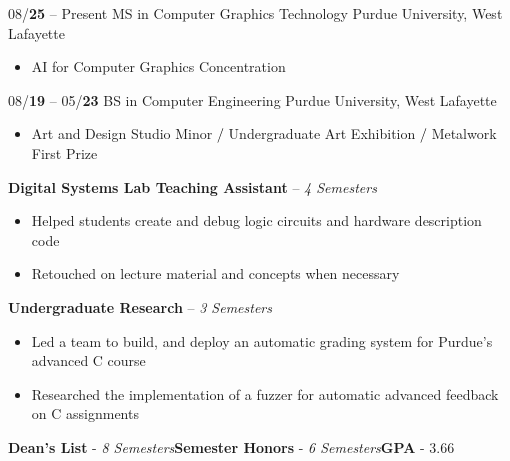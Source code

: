 \documentclass[9pt]{developercv} %
\begin{document}

\vspace{-\headheight}



\begin{entrylist}
	\vspace{-.5\headheight}
	\entry
		{08/\textbf{25} -- Present}
		{MS in Computer Graphics Technology}
		{Purdue University, West Lafayette}
		{
			\vspace{-\baselineskip}
			\begin{itemize}[noitemsep,topsep=0pt]
				\item[$\ast$] AI for Computer Graphics Concentration
			\end{itemize}
		}
	\entry
		{08/\textbf{19} -- 05/\textbf{23}}
		{BS in Computer Engineering}
		{Purdue University, West Lafayette}
		{
			\vspace{-\baselineskip}
			\begin{itemize}[noitemsep,topsep=0pt]
				\item[$\ast$] Art and Design Studio Minor$\hspace{1mm}/\hspace{1mm}$Undergraduate Art Exhibition$\hspace{1mm}/\hspace{1mm}$Metalwork First Prize
			\end{itemize}
			\textbf{Digital Systems Lab Teaching Assistant} -- \textit{4 Semesters}
			\begin{itemize}[noitemsep,topsep=0pt]
				\setlength\itemsep{0pt}
				\item[$\ast$] Helped students create and debug logic circuits and hardware description code
				\item[$\ast$] Retouched on lecture material and concepts when necessary
			\end{itemize}
			\textbf{Undergraduate Research} -- \textit{3 Semesters}
			\begin{itemize}[noitemsep,topsep=0pt]
				\setlength\itemsep{0pt}
				\item[$\ast$] Led a team to build, and deploy an automatic grading system for Purdue's advanced C course
				\item[$\ast$] Researched the implementation of a fuzzer for automatic advanced feedback on C assignments
			\end{itemize}
		\textbf{Dean's List} - \textit{8 Semesters}\slashsep\textbf{Semester Honors} - \textit{6 Semesters}\slashsep\textbf{GPA} - 3.66
		}
\end{entrylist}
\end{document}

